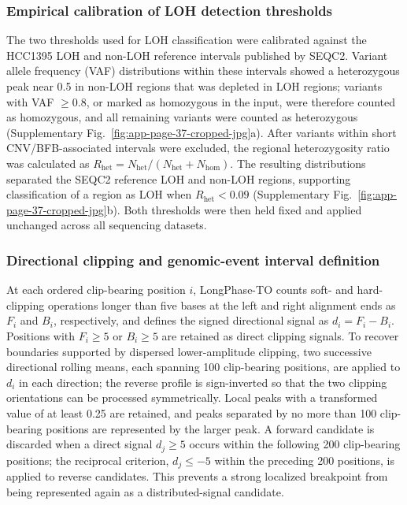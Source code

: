 \documentclass[pdflatex,sn-nature]{sn-jnl}
\begin{document}
\subsubsection{Empirical calibration of LOH detection thresholds}\label{methodology-for-loss-of-heterozygosity-loh-detection}

The two thresholds used for LOH classification were calibrated against the HCC1395 LOH and non-LOH reference intervals published by SEQC2. Variant allele frequency (VAF) distributions within these intervals showed a heterozygous peak near 0.5 in non-LOH regions that was depleted in LOH regions; variants with VAF $\geq0.8$, or marked as homozygous in the input, were therefore counted as homozygous, and all remaining variants were counted as heterozygous (Supplementary Fig.~\ref{fig:app-page-37-cropped-jpg}a). After variants within short CNV/BFB-associated intervals were excluded, the regional heterozygosity ratio was calculated as \(R_{\mathrm{het}}=N_{\mathrm{het}}/(N_{\mathrm{het}}+N_{\mathrm{hom}})\). The resulting distributions separated the SEQC2 reference LOH and non-LOH regions, supporting classification of a region as LOH when \(R_{\mathrm{het}}<0.09\) (Supplementary Fig.~\ref{fig:app-page-37-cropped-jpg}b). Both thresholds were then held fixed and applied unchanged across all sequencing datasets.

\subsubsection{Directional clipping and genomic-event interval definition}\label{supp:directional-clipping}

At each ordered clip-bearing position \(i\), LongPhase-TO counts soft- and hard-clipping operations longer than five bases at the left and right alignment ends as \(F_i\) and \(B_i\), respectively, and defines the signed directional signal as \(d_i=F_i-B_i\). Positions with \(F_i\geq5\) or \(B_i\geq5\) are retained as direct clipping signals. To recover boundaries supported by dispersed lower-amplitude clipping, two successive directional rolling means, each spanning 100 clip-bearing positions, are applied to \(d_i\) in each direction; the reverse profile is sign-inverted so that the two clipping orientations can be processed symmetrically. Local peaks with a transformed value of at least 0.25 are retained, and peaks separated by no more than 100 clip-bearing positions are represented by the larger peak. A forward candidate is discarded when a direct signal \(d_j\geq5\) occurs within the following 200 clip-bearing positions; the reciprocal criterion, \(d_j\leq-5\) within the preceding 200 positions, is applied to reverse candidates. This prevents a strong localized breakpoint from being represented again as a distributed-signal candidate.
\end{document}
